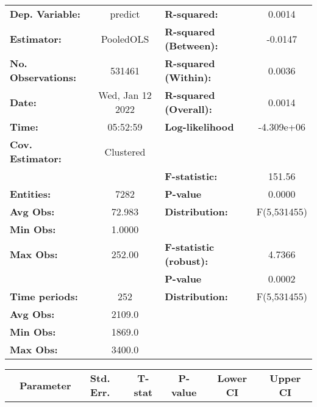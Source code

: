 \begin{center}
\begin{tabular}{lclc}
\toprule
\textbf{Dep. Variable:}    &      predict       & \textbf{  R-squared:         }   &      0.0014      \\
\textbf{Estimator:}        &     PooledOLS      & \textbf{  R-squared (Between):}  &     -0.0147      \\
\textbf{No. Observations:} &       531461       & \textbf{  R-squared (Within):}   &      0.0036      \\
\textbf{Date:}             &  Wed, Jan 12 2022  & \textbf{  R-squared (Overall):}  &      0.0014      \\
\textbf{Time:}             &      05:52:59      & \textbf{  Log-likelihood     }   &    -4.309e+06    \\
\textbf{Cov. Estimator:}   &     Clustered      & \textbf{                     }   &                  \\
\textbf{}                  &                    & \textbf{  F-statistic:       }   &      151.56      \\
\textbf{Entities:}         &        7282        & \textbf{  P-value            }   &      0.0000      \\
\textbf{Avg Obs:}          &       72.983       & \textbf{  Distribution:      }   &   F(5,531455)    \\
\textbf{Min Obs:}          &       1.0000       & \textbf{                     }   &                  \\
\textbf{Max Obs:}          &       252.00       & \textbf{  F-statistic (robust):} &      4.7366      \\
\textbf{}                  &                    & \textbf{  P-value            }   &      0.0002      \\
\textbf{Time periods:}     &        252         & \textbf{  Distribution:      }   &   F(5,531455)    \\
\textbf{Avg Obs:}          &       2109.0       & \textbf{                     }   &                  \\
\textbf{Min Obs:}          &       1869.0       & \textbf{                     }   &                  \\
\textbf{Max Obs:}          &       3400.0       & \textbf{                     }   &                  \\
\bottomrule
\end{tabular}
\begin{tabular}{lcccccc}
                & \textbf{Parameter} & \textbf{Std. Err.} & \textbf{T-stat} & \textbf{P-value} & \textbf{Lower CI} & \textbf{Upper CI}  \\

\end{tabular}
\end{center}
